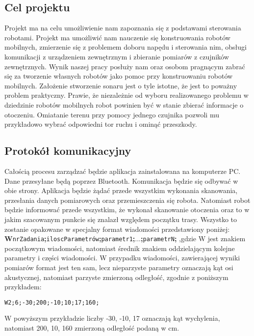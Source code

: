 \subsection{Cel projektu}
Projekt ma na celu umożliwienie nam zapoznania się z podstawami sterowania robotami. Projekt ma umożliwić nam nauczenie się konstruowania robotów mobilnych, zmierzenie się z problemem doboru napędu i sterowania nim, obsługi komunikacji z urządzeniem zewnętrznym i zbieranie pomiarów z czujników zewnętrznych. Wynik naszej pracy posłuży nam oraz osobom pragnącym zabrać się za tworzenie własnych robotów jako pomoc przy konstruowaniu robotów mobilnych. \newline
Założenie stworzenie sonaru jest o tyle istotne, że jest to poważny problem praktyczny. Prawie, że niezależnie od wyboru realizowanego problemu w dziedzinie robotów mobilnych robot powinien być w stanie zbierać informacje o otoczeniu. Omiatanie terenu przy pomocy jednego czujnika pozwoli mu przykładowo wybrać odpowiedni tor ruchu i ominąć przeszkody.
\subsection{Protokół komunikacyjny}
Całością procesu zarządzać będzie aplikacja zainstalowana na komputerze PC. Dane przesyłane będą poprzez Bluetooth. Komunikacja będzie się odbywać w obie strony. Aplikacja będzie żądać przede wszystkim wykonania skanowania, przesłania danych pomiarowych oraz przemieszczenia się robota. Natomiast robot będzie informować przede wszystkim, że wykonał skanowanie otoczenia oraz to w jakim szacowanym punkcie się znalazł względem początku trasy. Wszystko to zostanie opakowane w specjalny format wiadomości przedstawiony poniżej:
\newline
\textbf{W}\verb+nrZadania+\textbf{;}\verb+iloscParametrów+\textbf{;}\verb+parametr1+\textbf{;}...\textbf{;}\verb+parametrN+\textbf{;}
\newline
,gdzie W jest znakiem początkowym wiadomości, natomiast średnik znakiem oddzielającym kolejne parametry i części wiadomości.
\newline
W przypadku wiadomości, zawierającej wyniki pomiarów format jest ten sam, lecz nieparzyste parametry oznaczają kąt osi akustycznej, natomiast parzyste zmierzoną odległość, zgodnie z poniższym przykładem:\newline
\begin{verbatim}
W2;6;-30;200;-10;10;17;160;
\end{verbatim}
W powyższym przykładzie liczby -30, -10, 17 oznaczają kąt wychylenia, natomiast 200, 10, 160 zmierzoną odległość podaną w cm. 

